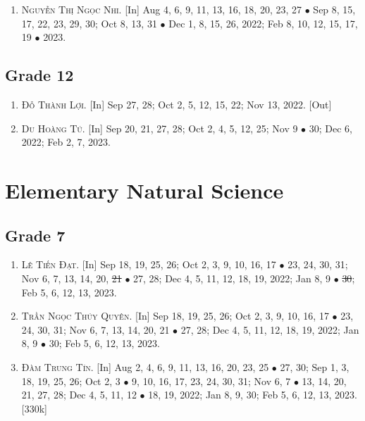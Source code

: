\documentclass{article}
\numberwithin{equation}{section}
\begin{document}
\begin{enumerate}
	\item \textsc{Nguyễn Thị Ngọc Nhi.} \textsf{[In]} Aug 4, 6, 9, 11, 13, 16, 18, 20, 23, 27 $\bullet$ Sep 8, 15, 17, 22, 23, 29, 30; Oct 8, 13, 31 $\bullet$ Dec 1, 8,  15, 26, 2022; Feb 8, 10, 12, 15, 17, 19 $\bullet$ 2023.
\end{enumerate}

\subsection{Grade 12}

\begin{enumerate}
	\item \textsc{Đỗ Thành Lợi.} \textsf{[In]} Sep 27, 28; Oct 2, 5, 12, 15, 22; Nov 13, 2022. \textsf{[Out]}
	\item \textsc{Du Hoàng Tú.} \textsf{[In]} Sep 20, 21, 27, 28; Oct 2, 4, 5, 12, 25; Nov 9 $\bullet$ 30; Dec 6, 2022; Feb 2, 7, 2023.
\end{enumerate}


\section{Elementary Natural Science}

\subsection{Grade 7}

\begin{enumerate}
	\item \textsc{Lê Tiến Đạt.} \textsf{[In]} Sep 18, 19, 25, 26; Oct 2, 3, 9, 10, 16, 17 $\bullet$ 23, 24, 30, 31; Nov 6, 7, 13, 14, 20, \st{21} $\bullet$ 27, 28; Dec 4, 5, 11, 12, 18, 19, 2022; Jan 8, 9 $\bullet$ \st{30}; Feb 5, 6, 12, 13, 2023.
	\item \textsc{Trần Ngọc Thúy Quyên.} \textsf{[In]} Sep 18, 19, 25, 26; Oct 2, 3, 9, 10, 16, 17 $\bullet$ 23, 24, 30, 31; Nov 6, 7, 13, 14, 20, 21 $\bullet$ 27, 28; Dec 4, 5, 11, 12, 18, 19, 2022; Jan 8, 9 $\bullet$ 30; Feb 5, 6, 12, 13, 2023.
	\item \textsc{Đàm Trung Tín.} \textsf{[In]} Aug 2, 4, 6, 9, 11, 13, 16, 20, 23, 25 $\bullet$ 27, 30; Sep 1, 3, 18, 19, 25, 26; Oct 2, 3 $\bullet$ 9, 10, 16, 17, 23, 24, 30, 31; Nov 6, 7 $\bullet$ 13, 14, 20, 21, 27, 28; Dec 4, 5, 11, 12 $\bullet$ 18, 19, 2022; Jan 8, 9, 30; Feb 5, 6, 12, 13, 2023. [330k]
\end{enumerate}
\end{document}
